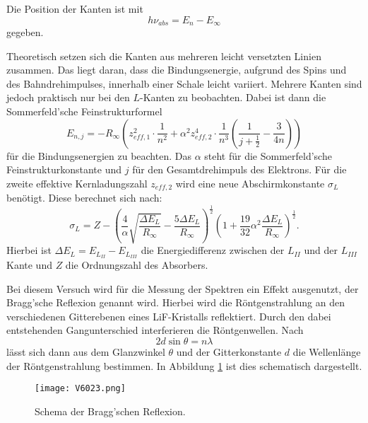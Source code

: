 \documentclass[
  bibliography=totoc,     %
  captions=tableheading,  %
  titlepage=firstiscover, %
]{scrartcl}
\begin{document}
\noindent
Die Position der Kanten ist mit
\begin{equation}
  h \nu_{abs} = E_n - E_\infty
  \label{eqn:abskante}
\end{equation}
gegeben.

\noindent
Theoretisch setzen sich die Kanten aus mehreren leicht versetzten Linien
zusammen. Das liegt daran, dass die Bindungsenergie, aufgrund des Spins und
des Bahndrehimpulses, innerhalb einer Schale leicht variiert. Mehrere Kanten
sind jedoch praktisch nur bei den $L$-Kanten zu beobachten. Dabei ist dann die
Sommerfeld'sche Feinstrukturformel
\begin{equation}
  E_{n,j} = - R_\infty \left( z_{eff,1}^2 \cdot \frac{1}{n^2} + \alpha^2 z_{eff,2}^4 \cdot \frac{1}{n^3} \left( \frac{1}{j+\frac{1}{2}} - \frac{3}{4n} \right) \right)
  \label{eqn:sommerfeld}
\end{equation}
für die Bindungsenergien zu beachten.
Das $\alpha$ steht für die Sommerfeld'sche Feinstrukturkonstante und $j$ für
den Gesamtdrehimpuls des Elektrons.
Für die zweite effektive Kernladungszahl $z_{eff,2}$ wird eine neue
Abschirmkonstante $\sigma_L$ benötigt.
Diese berechnet sich nach:
\begin{equation}
  \sigma_L = Z - \left( \frac{4}{\alpha} \sqrt{\frac{\Delta E_L}{R_\infty}} -
  \frac{5 \Delta E_L}{R_\infty} \right)^\frac{1}{2} \left( 1+ \frac{19}{32}
  \alpha^2 \frac{\Delta E_L}{R_\infty} \right)^\frac{1}{2}.
  \label{eqn:sigl}
\end{equation}
Hierbei ist $\Delta E_L = E_{L_{II}} - E_{L_{III}}$ die Energiedifferenz
zwischen
der $L_{II}$ und der $L_{III}$ Kante und $Z$ die Ordnungszahl des Absorbers.

\noindent
Bei diesem Versuch wird für die Messung der Spektren ein Effekt ausgenutzt, der
Bragg'sche Reflexion genannt wird. Hierbei wird die Röntgenstrahlung an den
verschiedenen Gitterebenen eines LiF-Kristalls reflektiert. Durch den dabei
entstehenden Gangunterschied interferieren die Röntgenwellen. Nach
\begin{equation}
  2 d \sin \theta = n \lambda
  \label{eqn:bragg}
\end{equation}
lässt sich dann aus dem Glanzwinkel $\theta$ und der Gitterkonstante $d$ die
Wellenlänge der Röntgenstrahlung bestimmen. In Abbildung \ref{fig:V6023} ist
dies schematisch dargestellt.
\begin{figure}[htb]
  \centering
  \texttt{[image: V6023.png]}
  \caption{Schema der Bragg'schen Reflexion. \cite{anleitung}}
  \label{fig:V6023}
\end{figure}
\clearpage
\end{document}
